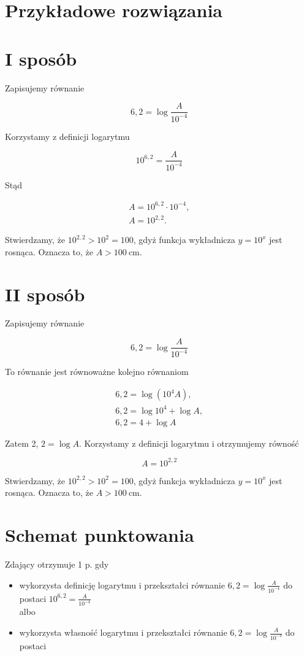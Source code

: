 \documentclass[10pt]{article}
\begin{document}
\section*{Przykładowe rozwiązania}
\section*{I sposób}
Zapisujemy równanie

$$
6,2=\log \frac{A}{10^{-4}}
$$

Korzystamy z definicji logarytmu

$$
10^{6,2}=\frac{A}{10^{-4}}
$$

Stąd

$$
\begin{gathered}
A=10^{6,2} \cdot 10^{-4}, \\
A=10^{2,2} .
\end{gathered}
$$

Stwierdzamy, że $10^{2,2}>10^{2}=100$, gdyż funkcja wykładnicza $y=10^{x}$ jest rosnąca. Oznacza to, że $A>100 \mathrm{~cm}$.

\section*{II sposób}
Zapisujemy równanie

$$
6,2=\log \frac{A}{10^{-4}}
$$

To równanie jest równoważne kolejno równaniom

$$
\begin{gathered}
6,2=\log \left(10^{4} A\right), \\
6,2=\log 10^{4}+\log A, \\
6,2=4+\log A
\end{gathered}
$$

Zatem 2, $2=\log A$. Korzystamy z definicji logarytmu i otrzymujemy równość

$$
A=10^{2,2}
$$

Stwierdzamy, że $10^{2,2}>10^{2}=100$, gdyż funkcja wykładnicza $y=10^{x}$ jest rosnąca. Oznacza to, że $A>100 \mathrm{~cm}$.

\section*{Schemat punktowania}
Zdający otrzymuje 1 p. gdy

\begin{itemize}
  \item wykorzysta definicję logarytmu i przekształci równanie $6,2=\log \frac{A}{10^{-4}}$ do postaci $10^{6,2}=\frac{A}{10^{-4}}$\\
albo
  \item wykorzysta własność logarytmu i przekształci równanie $6,2=\log \frac{A}{10^{-4}}$ do postaci
\end{itemize}
\end{document}
